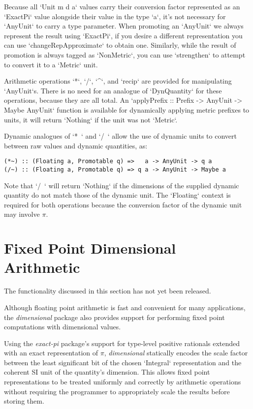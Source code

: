 \documentclass[11pt]{report}
\newcommand{\packagename}[1]{\textit{#1}}
\newcommand{\thispackage}{\packagename{dimensional}}
\newcommand{\prerelease}{\begin{framed}
The functionality discussed in this section has not yet been released.
\end{framed}}
\begin{document}
Because all `Unit m d a` values carry their conversion factor represented as an `ExactPi` value alongside their value in
the type `a`, it's not necessary for `AnyUnit` to carry a type parameter. When promoting an `AnyUnit` we always represent
the result using `ExactPi`, if you desire a different representation you can use `changeRepApproximate` to obtain one.
Similarly, while the result of promotion is always tagged as `NonMetric`, you can use `strengthen` to attempt to convert
it to a `Metric` unit.

Arithmetic operations `*`, `/`, `^`, and `recip` are provided for manipulating `AnyUnit`s. There is no need for an analogue
of `DynQuantity` for these operations, because they are all total. An `applyPrefix :: Prefix -> AnyUnit -> Maybe AnyUnit`
function is available for dynamically applying metric prefixes to units, it will return `Nothing` if the unit was not `Metric`.

Dynamic analogues of `*~` and `/~` allow the use of dynamic units to convert between raw values and dynamic quantities, as:

\begin{lstlisting}
(*~) :: (Floating a, Promotable q) =>   a -> AnyUnit -> q a
(/~) :: (Floating a, Promotable q) => q a -> AnyUnit -> Maybe a
\end{lstlisting}

Note that `/~` will return `Nothing` if the dimensions of the supplied dynamic quantity do not match those of the
dynamic unit. The `Floating` context is required for both operations because the conversion factor of the
dynamic unit may involve $ \pi $.



\chapter{Fixed Point Dimensional Arithmetic}

\prerelease{}

Although floating point arithmetic is fast and convenient for many applications, the \thispackage{} package also provides
support for performing fixed point computations with dimensional values.

Using the \packagename{exact-pi} package's support for type-level positive rationals extended with an exact representation
of $ \pi $, \thispackage{} statically encodes the scale factor between the least significant bit of the chosen `Integral`
representation and the coherent SI unit of the quantity's dimension. This allows fixed point representations to be
treated uniformly and correctly by arithmetic operations without requiring the programmer to appropriately scale the results
before storing them.
\end{document}
